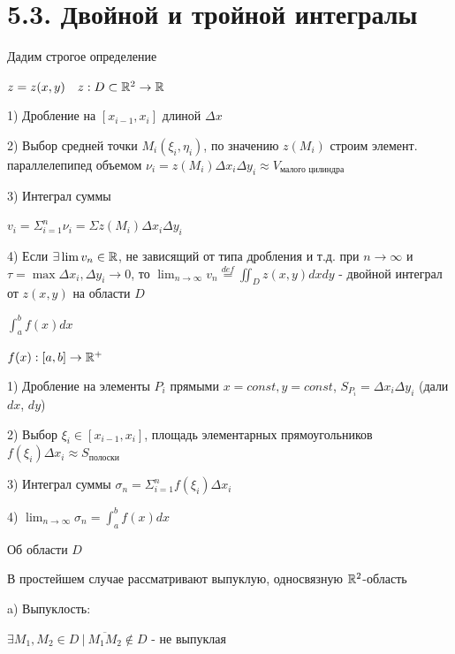 \documentclass[12pt]{article}
\begin{document}
    \section{5.3. Двойной и тройной интегралы}

    \Nota Дадим строгое определение

    \begin{multicols}{2}
        \Def $z = z(x, y) \quad z : D \subset \mathbb{R}^2 \rightarrow \mathbb{R}$

        1) Дробление на $[x_{i-1}, x_i]$ длиной $\Delta x$

        2) Выбор средней точки $M_i(\xi_i, \eta_i)$, по значению $z(M_i)$ строим элемент. параллелепипед объемом
        $\nu_i = z(M_i) \Delta x_i \Delta y_i \approx V_{\text{малого цилиндра}}$

        3) Интеграл суммы

        $v_i = \Sigma_{i=1}^n \nu_i = \Sigma z(M_i) \Delta x_i \Delta y_i$

        4) Если $\exists \lim v_n \in \mathbb{R}$, не зависящий от типа дробления и т.д. при $n \rightarrow \infty$ и
        $\tau = \max \Delta x_i, \Delta y_i \to 0$, то $\lim_{n\to\infty} v_n \stackrel{def}{=} \iint_D z(x, y) dx dy$ - двойной интеграл от $z(x, y)$ на области $D$



        \Mem $\int_a^b f(x) dx$

        $f(x) : [a, b] \rightarrow \mathbb{R}^+$

        \vspace{10mm}

        1) Дробление на элементы $P_i$ прямыми $x = const, y = const$, $S_{P_i} = \Delta x_i \Delta y_i$ (дали $dx$, $dy$)

        2) Выбор $\xi_i \in [x_{i-1}, x_i]$, площадь элементарных прямоугольников $f(\xi_i)\Delta x_i \approx S_{\text{полоски}}$

        3) Интеграл суммы $\sigma_n = \Sigma_{i=1}^n f(\xi_i) \Delta x_i$

        4) $\lim_{n\to\infty} \sigma_n = \int^b_a f(x) dx$

    \end{multicols}

    \Nota Об области $D$

    В простейшем случае рассматривают выпуклую, односвязную $\mathbb{R}^2$-область

    a) Выпуклость:

    $\exists M_1, M_2 \in D \ | \ \overline{M_1 M_2} \notin D$ - не выпуклая
\end{document}
